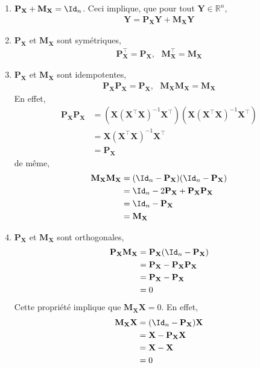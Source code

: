 \begin{enumerate}
\item $\mathbf{P}_\mathbf{X}+\mathbf{M}_\mathbf{X} = \Id_n$. Ceci implique, que pour tout $\mathbf{Y}\in \mathbb{R}^n$,
\begin{align*}
\mathbf{Y} = \mathbf{P}_\mathbf{X}\mathbf{Y}+\mathbf{M}_\mathbf{X}\mathbf{Y}
\end{align*}
\item $\mathbf{P}_\mathbf{X}$ et $\mathbf{M}_\mathbf{X}$ sont symétriques,
\begin{align*}
\mathbf{P}_\mathbf{X}^\top = \mathbf{P}_\mathbf{X}, \ \ \ \mathbf{M}_\mathbf{X}^\top= \mathbf{M}_\mathbf{X}
\end{align*}
\item $\mathbf{P}_\mathbf{X}$ et $\mathbf{M}_\mathbf{X}$ sont idempotentes,
\begin{align*}
\mathbf{P}_\mathbf{X}\mathbf{P}_\mathbf{X} = \mathbf{P}_\mathbf{X}, \ \ \ \mathbf{M}_\mathbf{X} \mathbf{M}_\mathbf{X}= \mathbf{M}_\mathbf{X}
\end{align*}
En effet,
\begin{align*}
\mathbf{P}_\mathbf{X}\mathbf{P}_\mathbf{X} &= \left(\mathbf{X}(\mathbf{X}^\top\mathbf{X})^{-1}\mathbf{X}^\top\right)\left(\mathbf{X}(\mathbf{X}^\top\mathbf{X})^{-1}\mathbf{X}^\top\right)\\ 
&= \mathbf{X}(\mathbf{X}^\top\mathbf{X})^{-1}\mathbf{X}^\top \\
&= \mathbf{P}_\mathbf{X}
\end{align*}
de même,
\begin{align*}
\mathbf{M}_\mathbf{X}\mathbf{M}_\mathbf{X} &= (\Id_n - \mathbf{P}_\mathbf{X})(\Id_n - \mathbf{P}_\mathbf{X})\\
& = \Id_n - 2\mathbf{P}_\mathbf{X} + \mathbf{P}_\mathbf{X}\mathbf{P}_\mathbf{X}\\
&=\Id_n - \mathbf{P}_\mathbf{X}\\
&=\mathbf{M}_\mathbf{X}
\end{align*}
\item $\mathbf{P}_\mathbf{X}$ et $\mathbf{M}_\mathbf{X}$ sont orthogonales,
\begin{align*}
\mathbf{P}_\mathbf{X}\mathbf{M}_\mathbf{X} &= \mathbf{P}_\mathbf{X}(\Id_n -  \mathbf{P}_\mathbf{X})\\
& =  \mathbf{P}_\mathbf{X} -  \mathbf{P}_\mathbf{X} \mathbf{P}_\mathbf{X}\\
&= \mathbf{P}_\mathbf{X}- \mathbf{P}_\mathbf{X}\\
&=0
\end{align*}
Cette propriété implique que $\mathbf{M}_\mathbf{X}\mathbf{X} = 0$. En effet,
\begin{align*}
\mathbf{M}_\mathbf{X}\mathbf{X} &= (\Id_n - \mathbf{P}_\mathbf{X})\mathbf{X}\\ 
&= \mathbf{X}-\mathbf{P}_\mathbf{X}\mathbf{X}\\
& = \mathbf{X} - \mathbf{X}\\
& = 0
\end{align*}
\end{enumerate}

